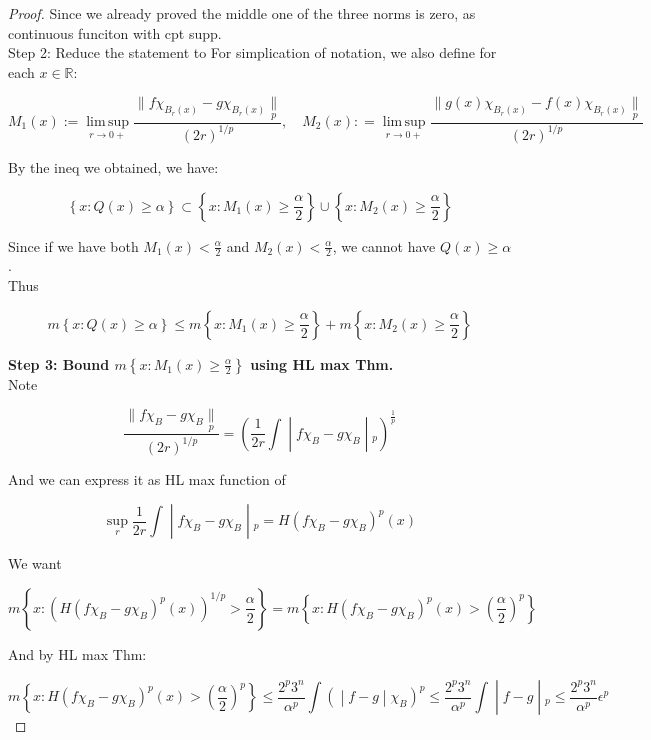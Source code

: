 \documentclass{qlnotes-export}
\begin{document}
\begin{proof}
Since we already proved the middle one of the three norms is zero, as continuous funciton with cpt supp.\\
Step 2: Reduce the statement to For simplication of notation, we also define for each \(x \in {\mathbb{R}}\):

\[M_{1}(x) := \operatorname{lim\, sup}\limits_{r\rightarrow 0 +}\frac{\parallel f\chi_{B_{r}(x)} - g\chi_{B_{r}(x)}\underset{p}{\parallel}}{(2r)^{1/p}},\quad M_{2}(x): = \operatorname{lim\, sup}\limits_{r\rightarrow 0 +}\frac{\parallel g(x)\chi_{B_{r}(x)} - f(x)\chi_{B_{r}(x)}\underset{p}{\parallel}}{(2r)^{1/p}}\]

By the ineq we obtained, we have:

\[\left\{ {x:Q(x) \geq \alpha} \right\} \subset \left\{ {x:M_{1}(x) \geq \frac{\alpha}{2}} \right\} \cup \left\{ {x:M_{2}(x) \geq \frac{\alpha}{2}} \right\}\]

Since if we have both \(M_{1}(x) < \frac{\alpha}{2}\) and \(M_{2}(x) < \frac{\alpha}{2}\), we cannot have \(Q(x) \geq \alpha\).\\
Thus

\[m\left\{ {x:Q(x) \geq \alpha} \right\} \leq m\left\{ {x:M_{1}(x) \geq \frac{\alpha}{2}} \right\} + m\left\{ {x:M_{2}(x) \geq \frac{\alpha}{2}} \right\}\]

\textbf{Step 3: Bound \(m\left\{ {x:M_{1}(x) \geq \frac{\alpha}{2}} \right\}\) using HL max Thm.}\\
Note

\[\left. \frac{\parallel f\chi_{B} - g\chi_{B}\underset{p}{\parallel}}{(2r)^{1/p}} = (\frac{1}{2r}\int \middle| f\chi_{B} - g\chi_{B} \middle| {}_{p})^{\frac{1}{p}} \right.\]

And we can express it as HL max function of

\[\left. \sup\limits_{r}\frac{1}{2r}\int \middle| f\chi_{B} - g\chi_{B} \middle| {}_{p} = H(f\chi_{B} - g\chi_{B})^{p}(x) \right.\]

We want

\[m\left\{ {x:(H(f\chi_{B} - g\chi_{B})^{p}(x))^{1/p} > \frac{\alpha}{2}} \right\} = m\left\{ {x:H(f\chi_{B} - g\chi_{B})^{p}(x) > (\frac{\alpha}{2})^{p}} \right\}\]

And by HL max Thm:

\[\left. m\left\{ {x:H(f\chi_{B} - g\chi_{B})^{p}(x) > (\frac{\alpha}{2})^{p}} \right\} \leq \frac{2^{p}3^{n}}{\alpha^{p}}\int( \middle| f - g \middle| \chi_{B})^{p} \leq \frac{2^{p}3^{n}}{\alpha^{p}}\int \middle| f - g \middle| {}_{p} \leq \frac{2^{p}3^{n}}{\alpha^{p}}\epsilon^{p} \right.\]


\end{proof}
\end{document}

